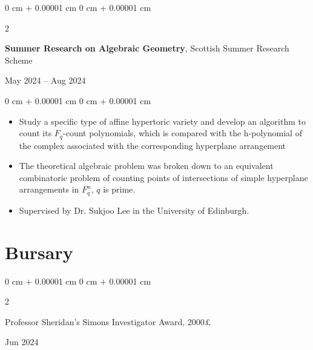 \documentclass[10pt, letterpaper]{article}
\newenvironment{highlights}{
    \begin{itemize}[
        topsep=0.10 cm,
        parsep=0.10 cm,
        partopsep=0pt,
        itemsep=0pt,
        leftmargin=0 cm + 10pt
    ]
}{
    \end{itemize}
} %
\newenvironment{onecolentry}{
    \begin{adjustwidth}{
        0 cm + 0.00001 cm
    }{
        0 cm + 0.00001 cm
    }
}{
    \end{adjustwidth}
} %
\newenvironment{twocolentry}[2][]{
    \onecolentry
    \def\secondColumn{#2}
    \setcolumnwidth{\fill, 4.5 cm}
    \begin{paracol}{2}
}{
    \switchcolumn \raggedleft \secondColumn
    \end{paracol}
    \endonecolentry
} %
\begin{document}
        \vspace{0.2 cm}

		\begin{twocolentry}{
	            May 2024 – Aug 2024
	        }
				\textbf{Summer Research on Algebraic Geometry}, Scottish Summer Research Scheme 
			\end{twocolentry}
	        \vspace{0.10 cm}
	        \begin{onecolentry}
	            \begin{highlights}
	                \item Study a specific type of affine hypertoric variety and develop an algorithm to count its $F_q$-count polynomials, which is compared with the h-polynomial of the complex associated with the corresponding hyperplane arrangement
					\item The theoretical algebraic problem was broken down to an equivalent combinatoric problem of counting points of intersections of simple hyperplane arrangements in $F^n_q$, $q$ is prime.
					\item Supervised by Dr. Sukjoo Lee in the University of Edinburgh.
	            \end{highlights}
	        \end{onecolentry}
    
    \section{Bursary}
        
        \begin{samepage}
            \begin{twocolentry}{
                Jun 2024
            }
                Professor Sheridan's Simons Investigator Award, 2000£
            \end{twocolentry}

        \end{samepage}
\end{document}
